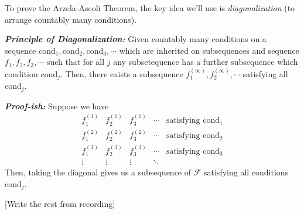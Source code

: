 \documentclass{article}
\begin{document}
\vskip 0.5cm
To prove the Arzela-Ascoli Theorem, the key idea we'll use is \emph{diagonalization} (to arrange countably many conditions).

\begin{dottedbox}
  \emph{\textbf{Principle of Diagonalization:}} Given countably many conditions on a sequence $\mathrm{cond}_1, \mathrm{cond}_2, \mathrm{cond}_3, \cdots$ which are inherited on subsequences and sequence $f_1, f_2, f_3, \cdots$ such that for all $j$ any subsetequence has a further subsequence which condition $\mathrm{cond}_j$. Then, there exists a subsequence $f_1^{(\infty)}, f_2^{(\infty)}, \cdots$ satisfying all $\mathrm{cond}_j$.

  \vskip 0.5cm
  \emph{\textbf{Proof-ish:}} Suppose we have
  \[ \begin{matrix}
    f_1^{(1)} & f_2^{(1)} & f_3^{(1)} & \cdots & \text{satisfying } \mathrm{cond_1} \\
    f_1^{(2)} & f_2^{(2)} & f_3^{(2)} & \cdots & \text{satisfying } \mathrm{cond_2} \\
    f_1^{(3)} & f_2^{(3)} & f_3^{(3)} & \cdots & \text{satisfying } \mathrm{cond_3} \\
    \vdots & \vdots & \vdots & \ddots
  \end{matrix} \]
  Then, taking the diagonal gives us a subsequence of $\mathcal{F}$ satisfying all conditions $\mathrm{cond}_j$.
\end{dottedbox}

[Write the rest from recording]
\end{document}
